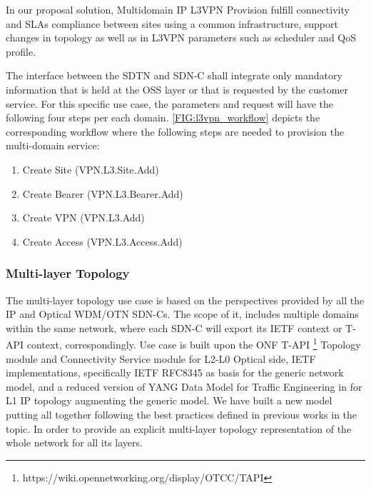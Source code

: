 \documentclass[a4paper,fleqn]{cas-dc}
\begin{document}
In our proposal solution, Multidomain IP L3VPN Provision fulfill connectivity and SLAs compliance between sites using a common infrastructure, support changes in topology as well as in L3VPN parameters such as scheduler and QoS profile. 

The interface between the SDTN and SDN-C shall integrate only mandatory information that is held at the OSS layer or that is requested by the customer service. For this specific use case, the parameters and request will have the following four steps per each domain. \ref{FIG:l3vpn_workflow} depicts the corresponding workflow where the following steps are needed to provision the multi-domain service:
\begin{enumerate}
    \item Create Site (VPN.L3.Site.Add)
    \item Create Bearer (VPN.L3.Bearer.Add)
    \item Create VPN (VPN.L3.Add)
    \item Create Access (VPN.L3.Access.Add)
\end{enumerate}


\subsubsection{Multi-layer Topology}
The multi-layer topology use case is based on the perspectives provided by all the IP and Optical WDM/OTN SDN-Cs. The scope of it, includes multiple domains within the same network, where each SDN-C will export its IETF context or T-API context, correspondingly. Use case is built upon the ONF T-API \footnote{https://wiki.opennetworking.org/display/OTCC/TAPI} Topology module and Connectivity Service module for L2-L0 Optical side, IETF implementations, specifically IETF RFC8345 \cite{rfc8345} as basis for the generic network model, and a reduced version of YANG Data Model for Traffic Engineering in \cite{ietf-teas-yang-te-topo-22} for L1 IP topology augmenting the generic model. We have built a new model putting all together following the best practices defined in previous works in the topic. In order to provide an explicit multi-layer topology representation of the whole network for all its layers. 
\end{document}

